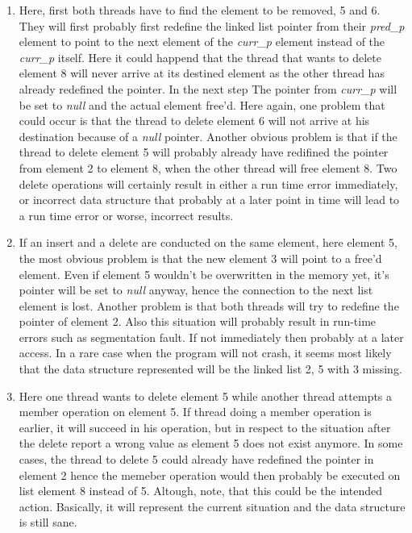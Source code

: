 \documentclass[a4paper,11pt,twoside]{article}
\begin{document}
\begin{enumerate}[label={\alph*)}]
\item Here, first both threads have to find the element to be removed, 5 and 6. They will first probably first redefine the linked list pointer from their \textit{pred\_p} element to point to the next element of the \textit{curr\_p} element instead of the \textit{curr\_p} itself. Here it could happend that the thread that wants to delete element 8 will never arrive at its destined element as the other thread has already redefined the pointer. In the next step The pointer from \textit{curr\_p} will be set to \textit{null} and the actual element free'd. Here again, one problem that could occur is that the thread to delete element 6 will not arrive at his destination because of a \textit{null} pointer. Another obvious problem is that if the thread to delete element 5 will probably already have redifined the pointer from element 2 to element 8, when the other thread will free element 8. Two delete operations will certainly result in either a run time error immediately, or incorrect data structure that probably at a later point in time will lead to a run time error or worse, incorrect results.
\item If an insert and a delete are conducted on the same element, here element 5, the most obvious problem is that the new element 3 will point to a free'd element. Even if element 5 wouldn't be overwritten in the memory yet, it's pointer will be set to \textit{null} anyway, hence the connection to the next list element is lost. Another problem is that both threads will try to redefine the pointer of element 2. Also this situation will probably result in run-time errors such as segmentation fault. If not immediately then probably at a later access. In a rare case when the program will not crash, it seems most likely that the data structure represented will be the linked list 2, 5 with 3 missing.

\item Here one thread wants to delete element 5 while another thread attempts a member operation on element 5. If thread doing a member operation is earlier, it will succeed in his operation, but in respect to the situation after the delete report a wrong value as element 5 does not exist anymore. In some cases, the thread to delete 5 could already have redefined the pointer in element 2 hence the memeber operation would then probably be executed on list element 8 instead of 5. Altough, note, that this could be the intended action. Basically, it will represent the current situation and the data structure is still sane.


\end{enumerate}
\end{document}
